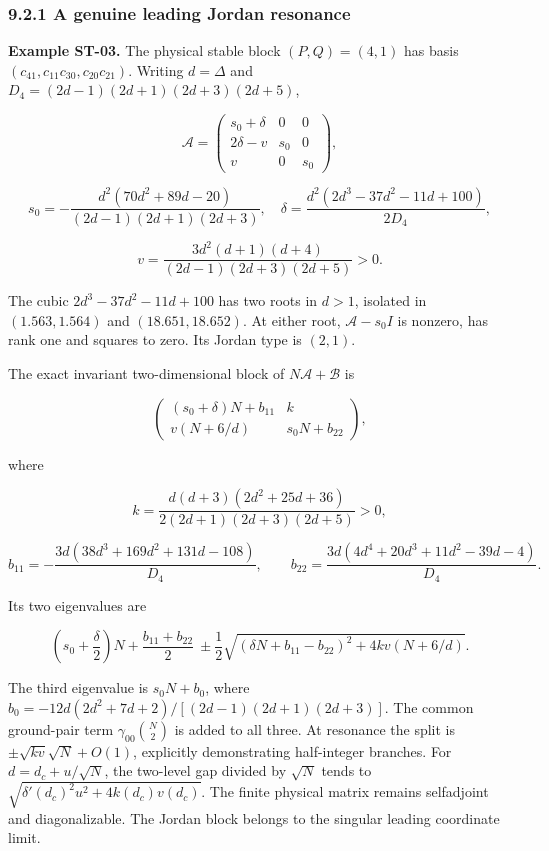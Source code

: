 \documentclass[a4paper,11pt]{article}
\numberwithin{equation}{section}
\begin{document}
\hypertarget{a-genuine-leading-jordan-resonance}{%
\subsubsection{9.2.1 A genuine leading Jordan resonance}\label{a-genuine-leading-jordan-resonance}}

\textbf{Example ST-03.} The physical stable block \((P,Q)=(4,1)\) has basis \((c_{41},c_{11}c_{30},c_{20}c_{21})\). Writing \(d=\Delta\) and \(D_4=(2d-1)(2d+1)(2d+3)(2d+5)\),

\[
\mathscr A=
\begin{pmatrix}
s_0+\delta&0&0\\
2\delta-v&s_0&0\\
v&0&s_0
\end{pmatrix},
\]

\[
s_0=-\frac{d^2(70d^2+89d-20)}{(2d-1)(2d+1)(2d+3)},\quad
\delta=\frac{d^2(2d^3-37d^2-11d+100)}{2D_4},
\]

\[
v=\frac{3d^2(d+1)(d+4)}{(2d-1)(2d+3)(2d+5)}>0.
\]

The cubic \(2d^3-37d^2-11d+100\) has two roots in \(d>1\), isolated in \((1.563,1.564)\) and \((18.651,18.652)\). At either root, \(\mathscr A-s_0I\) is nonzero, has rank one and squares to zero. Its Jordan type is \((2,1)\).

The exact invariant two-dimensional block of \(N\mathscr A+\mathscr B\) is

\[
\begin{pmatrix}
(s_0+\delta)N+b_{11}&k\\
v(N+6/d)&s_0N+b_{22}
\end{pmatrix},
\]

where

\[
k=\frac{d(d+3)(2d^2+25d+36)}{2(2d+1)(2d+3)(2d+5)}>0,
\]

\[
b_{11}=-\frac{3d(38d^3+169d^2+131d-108)}{D_4},\qquad
b_{22}=\frac{3d(4d^4+20d^3+11d^2-39d-4)}{D_4}.
\]

Its two eigenvalues are

\[
\left(s_0+\frac\delta2\right)N+\frac{b_{11}+b_{22}}2
\ \pm\frac12\sqrt{(\delta N+b_{11}-b_{22})^2+4kv(N+6/d)}.
\]

The third eigenvalue is \(s_0N+b_0\), where \(b_0=-12d(2d^2+7d+2)/[(2d-1)(2d+1)(2d+3)]\). The common ground-pair term \(\gamma_{00}\binom N2\) is added to all three. At resonance the split is \(\pm\sqrt{kv}\sqrt N+O(1)\), explicitly demonstrating half-integer branches. For \(d=d_c+u/\sqrt N\), the two-level gap divided by \(\sqrt N\) tends to \(\sqrt{\delta'(d_c)^2u^2+4k(d_c)v(d_c)}\). The finite physical matrix remains selfadjoint and diagonalizable. The Jordan block belongs to the singular leading coordinate limit.
\end{document}
